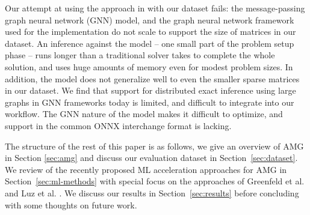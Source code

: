 \documentclass{svproc}
\newcommand{\etal}{et al. }
\begin{document}
Our attempt at using the approach in \cite{Luz2020} with our dataset fails: the message-passing graph neural network (GNN) model, and the graph neural network framework used for the implementation do not scale to support the size of matrices in our dataset. An inference against the model -- one small part of the problem setup phase -- runs longer than a traditional solver takes to complete the whole solution, and uses huge amounts of memory even for modest problem sizes. In addition, the model does not generalize well to even the smaller sparse matrices in our dataset. We find that support for distributed exact inference using large graphs in GNN frameworks today is limited, and difficult to integrate into our workflow. The GNN nature of the model makes it difficult to optimize, and support in the common ONNX interchange format is lacking.

The structure of the rest of this paper is as follows, we give an overview of AMG in Section \ref{sec:amg} and discuss our evaluation dataset in Section~\ref{sec:dataset}. We review of the recently proposed ML acceleration approaches for AMG in Section~\ref{sec:ml-methods} with special focus on the approaches of Greenfeld \etal \cite{Greenfeld2019} and Luz \etal \cite{Luz2020}. We discuss our results in Section~\ref{sec:results} before concluding with some thoughts on future work.




\end{document}
